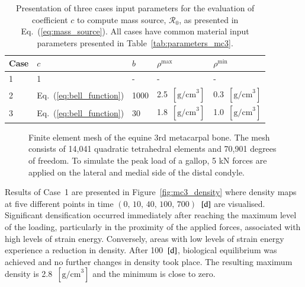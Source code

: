 \documentclass[review]{elsarticle}
\numberwithin{equation}{section}
\begin{document}
\begin{table}[h]
	\centering
	\begin{tabular}{lllll}
		\hline
		Case                  & $c$              				       & $b$     &$\rho^\mathrm{max}$               &$\rho^\mathrm{min}$ \\ \hline
		1                     & 1              								 & -       & -                                & -\\
		2                     & Eq.~(\ref{eq:bell_function})   & 1000    & 2.5~$[{\text{g/cm}}^3]$          & 0.3~$[{\text{g/cm}}^3]$\\
		3                     & Eq.~(\ref{eq:bell_function})   & 30      & 1.8~$[{\text{g/cm}}^3]$          &1.0~$[{\text{g/cm}}^3]$ \\
		\hline
	\end{tabular} 
	\caption{Presentation of three cases input parameters for the evaluation of coefficient $c$ to compute mass source, $\mathcal{R}_0$, as presented in Eq.~(\ref{eq:mass_source}). All cases have common material input parameters presented in Table~\ref{tab:parameters_mc3}.}
	\label{tab:three_cases}
\end{table}

\begin{figure}[h]
	\begin{center}
		\caption{Finite element mesh of the equine 3rd metacarpal bone. The mesh consists of 14,041 quadratic tetrahedral elements and 70,901 degrees of freedom. To simulate the peak load of a gallop, 5 kN forces are applied on the lateral and medial side of the distal condyle.}
		\label{fig:mc3_BC}
	\end{center}
\end{figure}

Results of Case~1 are presented in Figure~\ref{fig:mc3_density} where density maps at five different points in time $(\text{0, 10, 40, 100, 700})$~$[\text d]$ are visualised. 
Significant densification occurred immediately after reaching the maximum level of the loading, particularly in the proximity of the applied forces, associated with high levels of strain energy. Conversely, areas with low levels of strain energy experience a reduction in density.
After 100~$[{\text d}]$, biological equilibrium was achieved and no further changes in density took place. 
The resulting maximum density is 2.8~$[{\text {g/cm}}^3]$ and the minimum is close to zero.
\end{document}
